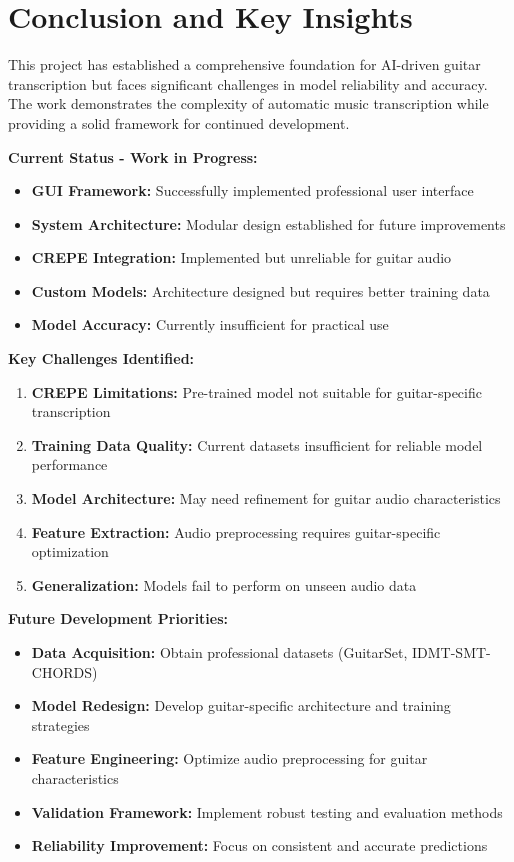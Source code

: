 \documentclass[11pt]{article}
\begin{document}
\section*{Conclusion and Key Insights}

This project has established a comprehensive foundation for AI-driven guitar transcription but faces significant challenges in model reliability and accuracy. The work demonstrates the complexity of automatic music transcription while providing a solid framework for continued development.

\textbf{Current Status - Work in Progress:}
\begin{itemize}[leftmargin=*,itemsep=2pt]
  \item \textbf{GUI Framework:} Successfully implemented professional user interface
  \item \textbf{System Architecture:} Modular design established for future improvements
  \item \textbf{CREPE Integration:} Implemented but unreliable for guitar audio
  \item \textbf{Custom Models:} Architecture designed but requires better training data
  \item \textbf{Model Accuracy:} Currently insufficient for practical use
\end{itemize}

\textbf{Key Challenges Identified:}
\begin{enumerate}[leftmargin=*,itemsep=2pt]
  \item \textbf{CREPE Limitations:} Pre-trained model not suitable for guitar-specific transcription
  \item \textbf{Training Data Quality:} Current datasets insufficient for reliable model performance
  \item \textbf{Model Architecture:} May need refinement for guitar audio characteristics
  \item \textbf{Feature Extraction:} Audio preprocessing requires guitar-specific optimization
  \item \textbf{Generalization:} Models fail to perform on unseen audio data
\end{enumerate}

\textbf{Future Development Priorities:}
\begin{itemize}[leftmargin=*,itemsep=2pt]
  \item \textbf{Data Acquisition:} Obtain professional datasets (GuitarSet, IDMT-SMT-CHORDS)
  \item \textbf{Model Redesign:} Develop guitar-specific architecture and training strategies
  \item \textbf{Feature Engineering:} Optimize audio preprocessing for guitar characteristics
  \item \textbf{Validation Framework:} Implement robust testing and evaluation methods
  \item \textbf{Reliability Improvement:} Focus on consistent and accurate predictions
\end{itemize}
\end{document}
